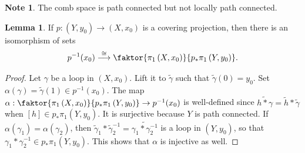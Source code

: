 \documentclass[10pt,letterpaper,cm]{nupset}
\theoremstyle{definition}
\newtheorem{note}[definition]{Note}
\theoremstyle{theorem}
\newtheorem{lemma}[definition]{Lemma}
\theoremstyle{remark}
\newcommand{\1}{\mathbb{1}}
\newcommand{\0}{\vec 0}
\begin{document}
\begin{note}
The comb space is path connected but not locally path connected. 
\end{note}

\smallskip

\begin{lemma}
If $p: \left(Y, y_0\right) \to \left(X, x_0\right)$ is a covering projection, then there is an isomorphism of sets $$p^{-1}(x_0) \overset{\cong}{\longrightarrow} \faktor{\pi_1\left(X, x_0\right)}{p_{\ast}\pi_1\left(Y, y_0\right)}.   $$
\end{lemma}
\begin{proof}
Let $\gamma$ be a loop in $\left(X, x_0\right)$. Lift it to $\tilde{\gamma}$ such that $\tilde{\gamma}(0) = y_0$. Set $\alpha(\gamma) = \tilde{\gamma}(1) \in p^{-1}(x_0)$. The map $\alpha : \faktor{\pi_1\left(X, x_0\right)}{p_{\ast}\pi_1\left(Y, y_0\right)} \to p^{-1}(x_0)$ is well-defined since $\widetilde{h \ast \gamma} = \tilde{h} \ast \tilde{\gamma}$ when $[h] \in p_{\ast}\pi_1\left(Y, y_0\right)$. It is surjective because $Y$ is path connected. If $\alpha(\gamma_1) = \alpha(\gamma_2)$, then $\tilde{\gamma}_1\ast \tilde{\gamma}_2^{-1}= \widetilde{\gamma_1 \ast \gamma_2^{-1}}$ is a loop in $\left(Y, y_0\right)$, so that $\gamma_1 \ast \gamma_2^{-1}  \in p_{\ast}\pi_1\left(Y, y_0\right)$. This shows that $\alpha$ is injective as well.
\end{proof}
\end{document}
